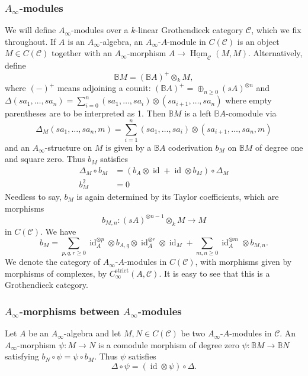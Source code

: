 \documentclass{amsart}
\numberwithin{equation}{section}
\let\cal\mathcal
\theoremstyle{definition}
\theoremstyle{remark}
\begin{document}
\subsubsection{$A_\infty$-modules}
We will define $A_\infty$-modules 
over a $k$-linear Grothendieck category ${{\cal C}}$, which we fix throughout.
If $A$ is an $A_\infty$-algebra, an $A_\infty$-$A$-module  in $C({{\cal C}})$ is an object $M\in C({{\cal C}})$ together
with an $A_\infty$-morphism $A{\rightarrow} \underline{\operatorname {Hom}}_{{\cal C}}(M,M)$. Alternatively,
define
\[
{\mathbb{B}} M=({\mathbb{B}} A)^+\otimes_k M,
\]
where $(-)^+$ means adjoining a counit: $({\mathbb{B}} A)^+=\oplus_{n\geq 0} (sA)^{\otimes n}$ and $\Delta(sa_1,\ldots,sa_n)=\sum_{i=0}^n
 (sa_1,\ldots,sa_i)\otimes (sa_{i+1},\ldots,sa_n)$ where empty parentheses are to be interpreted as 1. Then ${\mathbb{B}} M$ is a left ${\mathbb{B}} A$-comodule via
\[
\Delta_M (sa_1,\ldots,sa_n,m)=\sum_{i=1}^n (sa_1,\ldots,sa_i)\otimes (sa_{i+1},\ldots,sa_n,m)
\]
and an $A_\infty$-structure on $M$ is given by a ${\mathbb{B}} A$ coderivation $b_M$
on ${\mathbb{B}} M$ of degree one and square zero.  Thus $b_M$ satisfies 
\begin{align*}
\Delta_M\circ b_M&=(b_A\otimes {\operatorname{id}}+{\operatorname{id}}\otimes b_M)\circ \Delta_M\\
b_M^2&=0
\end{align*}
Needless to say, $b_M$ is again determined by its Taylor coefficients,
which are morphisms
\[
b_{M,n}:(sA)^{\otimes n-1}\otimes_k M{\rightarrow} M
\]
in $C({{\cal C}})$.
 We have
\[
b_M=\sum_{p,q,r\geq 0}{\operatorname{id}}_A^{\otimes p}\otimes b_{A,q}\otimes {\operatorname{id}}_A^{\otimes r}\otimes {\operatorname{id}}_M
+\sum_{m,n\geq 0} {\operatorname{id}}_A^{\otimes m} \otimes b_{M,n}.
\]
We denote the category of $A_\infty$-$A$-modules in $C({{\cal C}})$, with morphisms given by morphisms of complexes, by
$C_{\infty}^{\mathrm{strict}}(A,{{\cal C}})$. It is easy to see that this is a
Grothendieck category.
\subsubsection{$A_\infty$-morphisms between $A_\infty$-modules}
Let $A$ be an $A_\infty$-algebra and let $M,N\in C({{\cal C}})$ be two
$A_\infty$-$A$-modules in ${{\cal C}}$. An $A_\infty$-morphism $\psi:M{\rightarrow}
N$ is a comodule morphism of degree zero $\psi:{\mathbb{B}} M{\rightarrow} {\mathbb{B}} N$ satisfying $b_N\circ
\psi=\psi\circ b_M$. Thus $\psi$ satisfies
\[
\Delta \circ \psi =({\operatorname{id}}\otimes \psi)\circ \Delta.
\]
\end{document}
